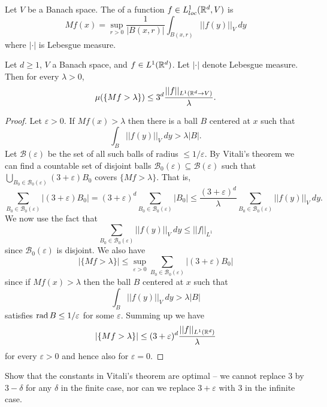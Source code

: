 \begin{definition}
Let $V$ be a Banach space.
The  of a function $f \in L^1_{loc}(\mathbb{R}^d, V)$ is
$$Mf(x) = \sup_{r > 0} \frac{1}{|B(x, r)|} \int_{B(x, r)} ||f(y)||_V ~dy$$
where $|\cdot|$ is Lebesgue measure.
\end{definition}

\begin{theorem}
Let $d \geq 1$, $V$ a Banach space, and $f \in L^{1}(\mathbb{R}^{d})$. Let $|\cdot|$ denote Lebesgue measure. Then for every $\lambda > 0$,
\[\mu(\{Mf > \lambda\}) \leq 3^{d} \frac{||f||_{L^{1}(\mathbb{R}^{d} \to V)}}{\lambda}.\]
\end{theorem}
\begin{proof}
Let $\varepsilon > 0$.
If $Mf(x) > \lambda$ then there is a ball $B$ centered at $x$ such that
$$\int_B ||f(y)||_V ~dy > \lambda |B|.$$
Let $\mathcal B(\varepsilon)$ be the set of all such balls of radius $\leq 1/\varepsilon$.
By Vitali's theorem we can find a countable set of disjoint balls $\mathcal B_0(\varepsilon) \subseteq \mathcal B(\varepsilon)$ such that $\bigcup_{B_{0} \in \mathcal B_{0}(\varepsilon)} (3 + \varepsilon)B_{0}$ covers $\{Mf > \lambda\}$.
That is,
$$\sum_{B_{0} \in \mathcal B_{0}(\varepsilon)} |(3 + \varepsilon) B_{0}| = (3 + \varepsilon)^d \sum_{B_{0} \in \mathcal B_{0}(\varepsilon)} |B_{0}| \leq \frac{(3 + \varepsilon)^d}{\lambda} \sum_{B_{0} \in \mathcal B_{0}(\varepsilon)} ||f(y)||_V ~dy.$$
We now use the fact that
$$\sum_{B_{0} \in \mathcal B_{0}(\varepsilon)} ||f(y)||_V ~dy \leq ||f||_{L^1}$$
since $\mathcal B_{0}(\varepsilon)$ is disjoint.
We also have
$$|\{Mf > \lambda\}| \leq \sup_{\varepsilon > 0} \sum_{B_{0} \in \mathcal B_{0}(\varepsilon)} |(3 + \varepsilon) B_{0}|$$
since if $Mf(x) > \lambda$ then the ball $B$ centered at $x$ such that
$$\int_B ||f(y)||_V ~dy > \lambda |B|$$
satisfies $\operatorname{rad} B \leq 1/\varepsilon$ for some $\varepsilon$.
Summing up we have
$$|\{Mf > \lambda\}| \leq (3 + \varepsilon)^{d} \frac{||f||_{L^{1}(\mathbb{R}^{d})}}{\lambda}$$
for every $\varepsilon > 0$ and hence also for $\varepsilon = 0$.
\end{proof}

\begin{exercise}
Show that the constants in Vitali's theorem are optimal -- we cannot replace $3$ by $3 - \delta$ for any $\delta$ in the finite case, nor can we replace $3 + \varepsilon$ with $3$ in the infinite case.
\end{exercise}

